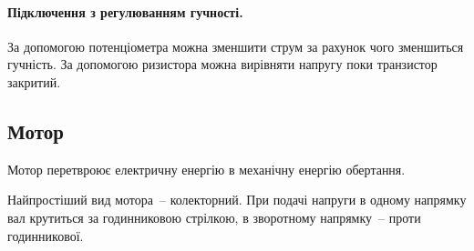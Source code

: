 \documentclass[12pt,a4paper]{book}  %
\begin{document}
\paragraph{Підключення з регулюванням гучності.} 

За допомогою потенціометра можна зменшити струм за рахунок чого зменшиться гучність.
За допомогою ризистора можна вирівняти напругу поки транзистор закритий.

\begin{figure}[h!]
\label{ris:image}
\end{figure}

\subsection{Мотор}

Мотор перетвроює електричну енергію в механічну енергію обертання.

\begin{figure}[h!]
\label{ris:image}
\end{figure}


Найпростіший вид мотора~-- колекторний. При подачі напруги в одному напрямку вал крутиться за годинниковою стрілкою, в зворотному напрямку~-- проти годинникової.
\end{document}
